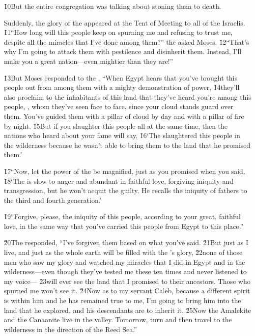 \v{10}But the entire congregation was talking about stoning them to death.

Suddenly, the glory of the  appeared at the Tent of Meeting to all of the Israelis. \v{11}``How long will this people keep on spurning me and refusing to trust me, despite all the miracles that I've done among them?'' the  asked Moses. \v{12}``That's why I'm going to attack them with pestilence and disinherit them. Instead, I'll make you a great nation---even mightier than they are!''

\v{13}But Moses responded to the , ``When Egypt hears that you've brought this people out from among them with a mighty demonstration of power, \v{14}they'll also proclaim to the inhabitants of this land that they've heard you're among this people, , whom they've seen face to face, since your cloud stands guard over them. You've guided them with a pillar of cloud by day and with a pillar of fire by night. \v{15}But if you slaughter this people all at the same time, then the nations who heard about your fame will say, \v{16}`The  slaughtered this people in the wilderness because he wasn't able to bring them to the land that he promised them.'

\v{17}``Now, let the power of the  be magnified, just as you promised when you said, \v{18}`The  is slow to anger and abundant in faithful love, forgiving iniquity and transgression, but he won't acquit the guilty. He recalls the iniquity of fathers to the third and fourth generation.'

\v{19}``Forgive, please, the iniquity of this people, according to your great, faithful love, in the same way that you've carried this people from Egypt to this place.''

\v{20}The  responded, ``I've forgiven them based on what you've said. \v{21}But just as I live, and just as the whole earth will be filled with the 's glory, \v{22}none of those men who saw my glory and watched my miracles that I did in Egypt and in the wilderness---even though they've tested me these ten times and never listened to my voice--- \v{23}will ever see the land that I promised to their ancestors. Those who spurned me won't see it. \v{24}Now as to my servant Caleb, because a different spirit is within him and he has remained true to me, I'm going to bring him into the land that he explored, and his descendants are to inherit it. \v{25}Now the Amalekite and the Canaanite live in the valley. Tomorrow, turn and then travel to the wilderness in the direction of the Reed Sea.''

